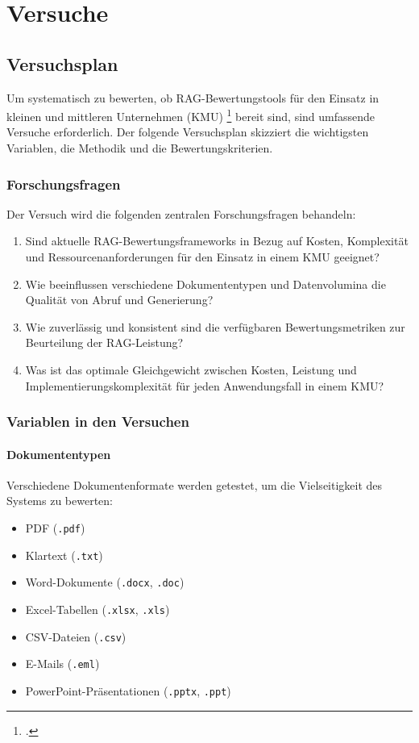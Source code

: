 \chapter{Versuche}

\section{Versuchsplan}

Um systematisch zu bewerten, ob RAG-Bewertungstools für den Einsatz in kleinen und mittleren Unternehmen (KMU) \footcite{esf_kmu_2025} bereit sind, sind umfassende Versuche erforderlich. Der folgende Versuchsplan skizziert die wichtigsten Variablen, die Methodik und die Bewertungskriterien.

\subsection{Forschungsfragen}

Der Versuch wird die folgenden zentralen Forschungsfragen behandeln:

\begin{enumerate}
    \item Sind aktuelle RAG-Bewertungsframeworks in Bezug auf Kosten, Komplexität und Ressourcenanforderungen für den Einsatz in einem KMU geeignet?
    \item Wie beeinflussen verschiedene Dokumententypen und Datenvolumina die Qualität von Abruf und Generierung?
    \item Wie zuverlässig und konsistent sind die verfügbaren Bewertungsmetriken zur Beurteilung der RAG-Leistung?
    \item Was ist das optimale Gleichgewicht zwischen Kosten, Leistung und Implementierungskomplexität für jeden Anwendungsfall in einem KMU?
\end{enumerate}

\subsection{Variablen in den Versuchen}

\subsubsection{Dokumententypen}
Verschiedene Dokumentenformate werden getestet, um die Vielseitigkeit des Systems zu bewerten:
\begin{itemize}
    \item PDF (\texttt{.pdf})
    \item Klartext (\texttt{.txt})
    \item Word-Dokumente (\texttt{.docx}, \texttt{.doc})
    \item Excel-Tabellen (\texttt{.xlsx}, \texttt{.xls})
    \item CSV-Dateien (\texttt{.csv})
    \item E-Mails (\texttt{.eml})
    \item PowerPoint-Präsentationen (\texttt{.pptx}, \texttt{.ppt})
\end{itemize}

